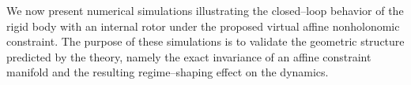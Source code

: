 \documentclass[letterpaper, 10 pt, conference]{ieeeconf}
\begin{document}










We now present numerical simulations illustrating the closed--loop behavior of the rigid body with an internal rotor under the proposed virtual affine nonholonomic constraint. 
The purpose of these simulations is to validate the geometric structure predicted by the theory, namely the exact invariance of an affine constraint manifold and the resulting regime--shaping effect on the dynamics.
\end{document}
